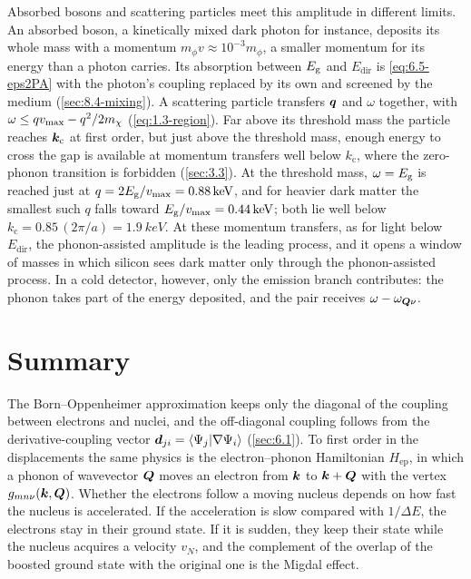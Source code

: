 Absorbed bosons and scattering particles meet this amplitude in different limits. An absorbed boson, a kinetically mixed dark photon for instance, deposits its whole mass with a momentum $m_\phi v \approx 10^{-3}m_\phi$, a smaller momentum for its energy than a photon carries. Its absorption between $E_{\mathrm{g}}$ and $E_{\mathrm{dir}}$ is \cref{eq:6.5-eps2PA} with the photon's coupling replaced by its own and screened by the medium (\cref{sec:8.4-mixing}). A scattering particle transfers $\bm{q}$ and $\omega$ together, with $\omega \le qv_{\mathrm{max}} - q^2/2m_{\chi}$ (\cref{eq:1.3-region}). Far above its threshold mass the particle reaches $\bm{k}_{\mathrm{c}}$ at first order, but just above the threshold mass, enough energy to cross the gap is available at momentum transfers well below $k_{\mathrm{c}}$, where the zero-phonon transition is forbidden (\cref{sec:3.3}). At the threshold mass, $\omega = E_{\mathrm{g}}$ is reached just at $q = 2E_{\mathrm{g}}/v_{\mathrm{max}} = \SI{0.88}{keV}$, and for heavier dark matter the smallest such $q$ falls toward $E_{\mathrm{g}}/v_{\mathrm{max}} = \SI{0.44}{keV}$; both lie well below $k_{\mathrm{c}} = 0.85\,(2\pi/a) = \SI{1.9}{keV}$. At these momentum transfers, as for light below $E_{\mathrm{dir}}$, the phonon-assisted amplitude is the leading process, and it opens a window of masses in which silicon sees dark matter only through the phonon-assisted process. In a cold detector, however, only the emission branch contributes: the phonon takes part of the energy deposited, and the pair receives $\omega - \omega_{\bm{Q}\nu}$.

\section*{Summary}

The Born--Oppenheimer approximation keeps only the diagonal of the coupling between electrons and nuclei, and the off-diagonal coupling follows from the derivative-coupling vector $\bm{d}_{ji} = \langle\Psi_j|\nabla\Psi_i\rangle$ (\cref{sec:6.1}). To first order in the displacements the same physics is the electron--phonon Hamiltonian $H_{\mathrm{ep}}$, in which a phonon of wavevector $\bm{Q}$ moves an electron from $\bm{k}$ to $\bm{k} + \bm{Q}$ with the vertex $g_{mn\nu}(\bm{k},\bm{Q})$. Whether the electrons follow a moving nucleus depends on how fast the nucleus is accelerated. If the acceleration is slow compared with $1/\Delta E$, the electrons stay in their ground state. If it is sudden, they keep their state while the nucleus acquires a velocity $v_N$, and the complement of the overlap of the boosted ground state with the original one is the Migdal effect.


